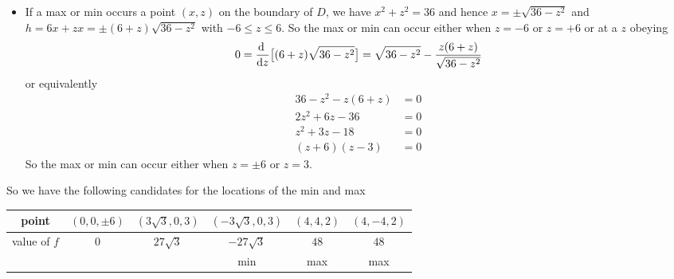 \begin{solution}
\begin{itemize}
\item
If a max or min occurs a point $(x,z)$ on the boundary of $D$, we 
have  $x^2+z^2=36$ and hence $x=\pm\sqrt{36-z^2}$ and $h=6x+zx=\pm(6+z)\sqrt{36-z^2}$ with 
$-6\le z\le 6$. So the max or min can occur either when $z=-6$ or $z=+6$
or at a $z$ obeying
\begin{align*}
0=\diff{}{z}\big[(6+z)\sqrt{36-z^2}\big]
 =\sqrt{36-z^2} - \frac{z(6+z)}{\sqrt{36-z^2}}
\end{align*}
or equivalently
\begin{align*}
36-z^2-z(6+z)&=0 \\
2z^2 +6z -36 &=0 \\
z^2 +3z -18 &=0 \\
(z+6)(z-3)&=0
\end{align*}
So the max or min can occur either when $z=\pm 6$ or $z=3$.
\end{itemize}
So we have the following candidates for the locations of the min and max
\begin{center}
\renewcommand{\arraystretch}{1.3}
     \begin{tabular}{|c|c|c|c|c|c|}
     \hline
       point
       &$(0,0, \pm 6)$
       &$(3\sqrt{3},0,3)$
       &$(-3\sqrt{3},0,3)$
       &$(4,4,2) $
       &$(4,-4,2) $ \\ \hline
       value of $f$
       &$0$
       &$27\sqrt{3}$
       &$-27\sqrt{3}$
       &$48$ 
       &$48$\\ \hline
       &
       & 
       &min 
       &max
       &max \\ \hline
     \end{tabular}
\renewcommand{\arraystretch}{1.0}
\end{center}
\end{solution}


